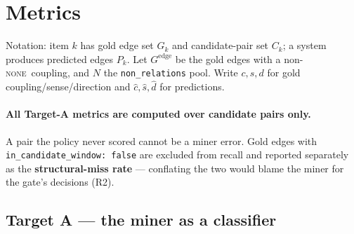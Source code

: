 \documentclass[11pt]{article}
\newcommand{\cNone}{\textsc{none}}
\begin{document}
\section{Metrics}
\label{sec:metrics}

Notation: item $k$ has gold edge set $G_k$ and candidate-pair set $C_k$; a system produces
predicted edges $P_k$. Let $G^{\text{edge}}$ be the gold edges with a non-\cNone\ coupling, and
$N$ the \texttt{non\_relations} pool. Write $c, s, d$ for gold coupling/sense/direction and
$\hat c, \hat s, \hat d$ for predictions.

\paragraph{All Target-A metrics are computed over candidate pairs only.} A pair the policy never
scored cannot be a miner error. Gold edges with
\texttt{in\_candidate\_window: false} are excluded from recall and reported separately as the
\textbf{structural-miss rate} --- conflating the two would blame the miner for the gate's
decisions (R2).

\subsection{Target A --- the miner as a classifier}
\label{sec:metrics-a}
\end{document}
